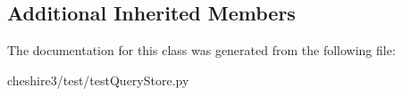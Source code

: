 \subsection*{Additional Inherited Members}


The documentation for this class was generated from the following file\-:\begin{DoxyCompactItemize}
\item 
cheshire3/test/test\-Query\-Store.\-py\end{DoxyCompactItemize}
